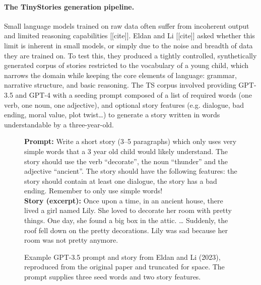 \documentclass{article}
\begin{document}
\paragraph{The TinyStories generation pipeline.} Small language models trained on raw data often suffer from incoherent output and limited reasoning capabilities [[cite]]. Eldan and Li [[cite]] asked whether this limit is inherent in small models, or simply due to the noise and breadth of data they are trained on. To test this, they produced a tightly controlled, synthetically generated corpus of stories restricted to the vocabulary of a young child, which narrows the domain while keeping the core elements of language: grammar, narrative structure, and basic reasoning. The TS corpus involved providing GPT-3.5 and GPT-4 with a seeding prompt composed of a list of required words (one verb, one noun, one adjective), and optional story features (e.g. dialogue, bad ending, moral value, plot twist\ldots) to generate a story written in words understandable by a three-year-old.

\begin{figure}[H]
  \centering
  \begin{tcolorbox}[storybox, title={TinyStories prompt and generated story}]
    \textbf{Prompt:} Write a short story (3--5 paragraphs) which only uses
    very simple words that a 3 year old child would likely understand.
    The story should use the verb ``decorate'', the noun ``thunder'' and
    the adjective ``ancient''. The story should have the following
    features: the story should contain at least one dialogue, the story
    has a bad ending. Remember to only use simple words! \\[4pt]
    \textbf{Story (excerpt):} Once upon a time, in an ancient house,
    there lived a girl named Lily. She loved to decorate her room with
    pretty things. One day, she found a big box in the attic.
    \ldots{} Suddenly, the roof fell down on the pretty decorations.
    Lily was sad because her room was not pretty anymore.
  \end{tcolorbox}
  \caption{Example GPT-3.5 prompt and story from Eldan and Li (2023), reproduced from the original paper and truncated for space. The prompt supplies three seed words and two story features.}
  \label{fig:ts-example}
\end{figure}
\end{document}
